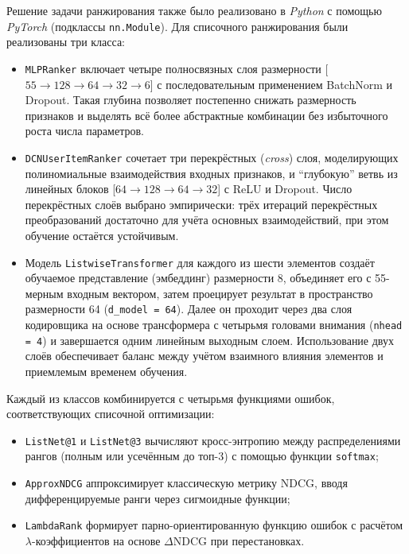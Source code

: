 Решение задачи ранжирования также было реализовано в \emph{Python} с помощью \emph{PyTorch} (подклассы \lstinline{nn.Module}). Для списочного ранжирования были реализованы три класса:
\begin{itemize}
    \item \lstinline{MLPRanker} включает четыре полносвязных слоя размерности [$55 \rightarrow 128 \rightarrow 64 \rightarrow 32 \rightarrow 6$] с последовательным применением BatchNorm и Dropout. Такая глубина позволяет постепенно снижать размерность признаков и выделять всё более абстрактные комбинации без избыточного роста числа параметров.
    \item \lstinline{DCNUserItemRanker} сочетает три перекрёстных (\emph{cross}) слоя, моделирующих полиномиальные взаимодействия входных признаков, и \enquote{глубокую} ветвь из линейных блоков [$64 \rightarrow 128 \rightarrow 64 \rightarrow 32$] с ReLU и Dropout. Число перекрёстных слоёв выбрано эмпирически: трёх итераций перекрёстных преобразований достаточно для учёта основных взаимодействий, при этом обучение остаётся устойчивым.
    \item Модель \lstinline{ListwiseTransformer} для каждого из шести элементов создаёт обучаемое представление (эмбеддинг) размерности 8, объединяет его с 55-мерным входным вектором, затем проецирует результат в пространство размерности 64 (\lstinline{d_model = 64}). Далее он проходит через два слоя кодировщика на основе трансформера с четырьмя головами внимания (\lstinline{nhead = 4}) и завершается одним линейным выходным слоем. Использование двух слоёв обеспечивает баланс между учётом взаимного влияния элементов и приемлемым временем обучения.
\end{itemize}
Каждый из классов комбинируется с четырьмя функциями ошибок, соответствующих списочной оптимизации:
\begin{itemize}
    \item \lstinline{ListNet@1} и \lstinline{ListNet@3} вычисляют кросс-энтропию между распределениями рангов (полным или усечённым до топ-3) с помощью функции \lstinline{softmax};
    \item \lstinline{ApproxNDCG} аппроксимирует классическую метрику NDCG, вводя дифференцируемые ранги через сигмоидные функции;
    \item \lstinline{LambdaRank} формирует парно-ориентированную функцию ошибок с расчётом $\lambda$-коэффициентов на основе $\Delta\mathrm{NDCG}$ при перестановках.
\end{itemize}

